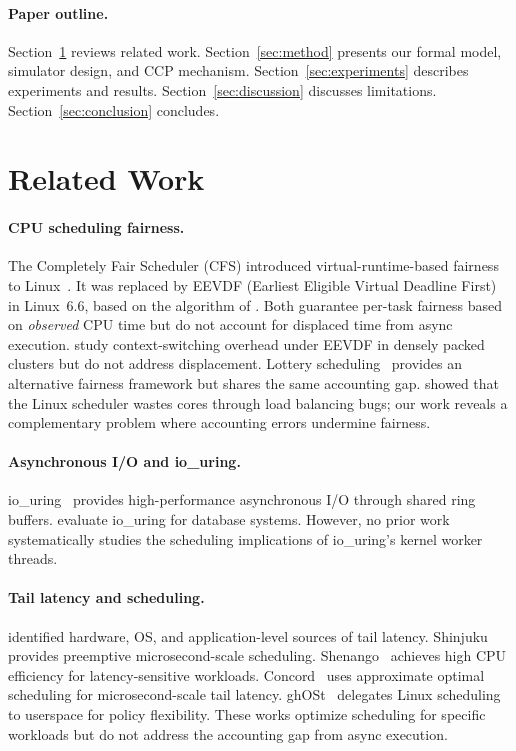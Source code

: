 \documentclass{article}
\begin{document}
\paragraph{Paper outline.} Section~\ref{sec:related} reviews related work. Section~\ref{sec:method} presents our formal model, simulator design, and CCP mechanism. Section~\ref{sec:experiments} describes experiments and results. Section~\ref{sec:discussion} discusses limitations. Section~\ref{sec:conclusion} concludes.

\section{Related Work}
\label{sec:related}

\paragraph{CPU scheduling fairness.}
The Completely Fair Scheduler (CFS) introduced virtual-runtime-based fairness to Linux~\citep{molnar2007cfs}. It was replaced by EEVDF (Earliest Eligible Virtual Deadline First) in Linux~6.6, based on the algorithm of \citet{stoica1996proportional}. Both guarantee per-task fairness based on \emph{observed} CPU time but do not account for displaced time from async execution. \citet{isstaif2025mitigating} study context-switching overhead under EEVDF in densely packed clusters but do not address displacement. Lottery scheduling~\citep{waldspurger1994lottery} provides an alternative fairness framework but shares the same accounting gap. \citet{lozi2016linux} showed that the Linux scheduler wastes cores through load balancing bugs; our work reveals a complementary problem where accounting errors undermine fairness.

\paragraph{Asynchronous I/O and io\_uring.}
io\_uring~\citep{axboe2019io_uring} provides high-performance asynchronous I/O through shared ring buffers. \citet{jasny2025high} evaluate io\_uring for database systems. However, no prior work systematically studies the scheduling implications of io\_uring's kernel worker threads.

\paragraph{Tail latency and scheduling.}
\citet{li2014tales} identified hardware, OS, and application-level sources of tail latency. Shinjuku~\citep{kaffes2019shinjuku} provides preemptive microsecond-scale scheduling. Shenango~\citep{ousterhout2019shenango} achieves high CPU efficiency for latency-sensitive workloads. Concord~\citep{iyer2023concord} uses approximate optimal scheduling for microsecond-scale tail latency. ghOSt~\citep{humphries2021ghost} delegates Linux scheduling to userspace for policy flexibility. These works optimize scheduling for specific workloads but do not address the accounting gap from async execution.
\end{document}

